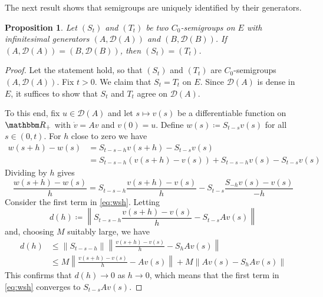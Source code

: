 \documentclass[12pt, reqno]{amsart}
\renewcommand{\leq}{\leqslant}
\newcommand{\1}{\mathbbm 1}
\newcommand{\dD}{\mathcal D}
\newcommand{\RR}{\mathbbm R}
\theoremstyle{plain}
\newtheorem{proposition}[theorem]{Proposition}
\theoremstyle{definition}
\begin{document}
The next result shows that semigroups are uniquely identified by their
generators.

\begin{proposition}\label{p:sgufg}
    Let $(S_t)$ and $(T_t)$ be two $C_0$-semigroups on $E$ with infinitesimal
    generators $(A, \dD(A))$ and $(B, \dD(B))$.  If $(A, \dD(A)) = (B, \dD(B))$,
    then $(S_t) = (T_t)$.
\end{proposition}

\begin{proof}
    Let the statement hold, so that $(S_t)$ and $(T_t)$ are $C_0$-semigroups
    $(A, \dD(A))$. Fix $t > 0$.  We claim that $S_t = T_t$ on $E$. Since
    $\dD(A)$ is dense in $E$, it suffices to show that $S_t$ and $T_t$ agree on
    $\dD(A)$.

    To this end, fix $u \in \dD(A)$ and let $s \mapsto v(s)$ be a differentiable
    function on $\RR_+$ with $\dot v = A v$ and $v(0) = u$.  Define $w(s)
    \coloneq S_{t-s} v(s)$ for all $s \in (0, t)$.
    For $h$ close to zero we have 
    \begin{align*}
        w(s + h) - w(s)
        & = S_{t-s-h} v(s + h) - S_{t-s} v(s)
        \\
        & = S_{t-s-h} (v(s + h) - v(s)) + S_{t-s-h} v(s) - S_{t-s} v(s)
    \end{align*}
    Dividing by $h$ gives
    \begin{equation}\label{eq:wsh}
        \frac{w(s + h) - w(s)}{h}
        = S_{t-s-h} \frac{v(s + h) - v(s)}{h} 
            - S_{t-s} \frac{S_{-h} v(s) - v(s)}{-h}
    \end{equation}
    Consider the first term in \eqref{eq:wsh}.  Letting
    \begin{equation*}
        d(h) \coloneq
        \left\|
           S_{t-s-h} \frac{v(s + h) - v(s)}{h} 
           - S_{t-s} A v(s)
        \right\|
    \end{equation*}
    and, choosing $M$ suitably large, we have
    \begin{align*}
        d(h) 
        & \leq 
        \|S_{t-s-h}\|
        \left\|
            \frac{v(s + h) - v(s)}{h} 
           - S_h A v(s)
        \right\|
        \\
        & \leq M
        \left\|
            \frac{v(s + h) - v(s)}{h} 
           - A v(s)
        \right\|
        + M \| Av(s) - S_h A v(s) \|
    \end{align*}
    This confirms that $d(h) \to 0$ as $h \to 0$, which means that the first
    term in \eqref{eq:wsh} converges to $S_{t-s} A v(s)$.


\end{proof}
\end{document}
